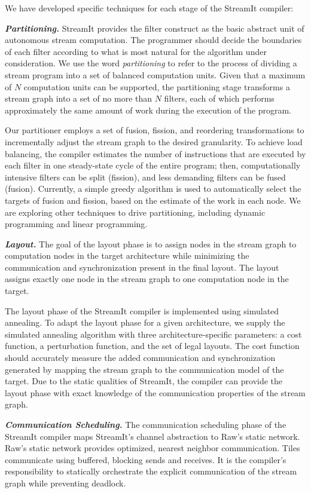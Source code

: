 We have developed specific techniques for each stage of the StreamIt
compiler:

{\bf {\em Partitioning.}} StreamIt provides the filter construct as the
basic abstract unit of autonomous stream computation.  The programmer
should decide the boundaries of each filter according to what is most
natural for the algorithm under consideration. We use the word {\it
partitioning} to refer to the process of dividing a stream program
into a set of balanced computation units.  Given that a maximum of $N$
computation units can be supported, the partitioning stage transforms
a stream graph into a set of no more than $N$ filters, each of which
performs approximately the same amount of work during the execution of
the program.

Our partitioner employs a set of fusion, fission, and reordering
transformations to incrementally adjust the stream graph to the
desired granularity.  To achieve load balancing, the compiler
estimates the number of instructions that are executed by each filter
in one steady-state cycle of the entire program; then, computationally
intensive filters can be split (fission), and less demanding filters
can be fused (fusion).  Currently, a simple greedy algorithm is used
to automatically select the targets of fusion and fission, based on
the estimate of the work in each node.  We are exploring other
techniques to drive partitioning, including dynamic programming and
linear programming.

{\bf {\em Layout.}} The goal of the layout phase is to assign nodes in the
stream graph to computation nodes in the target architecture while
minimizing the communication and synchronization present in the final
layout.  The layout assigns exactly one node in the stream graph to
one computation node in the target.

The layout phase of the StreamIt compiler is implemented using
simulated annealing.  To adapt the layout phase for a given
architecture, we supply the simulated annealing algorithm with three
architecture-specific parameters: a cost function, a perturbation
function, and the set of legal layouts.  The cost function should
accurately measure the added communication and synchronization
generated by mapping the stream graph to the communication model of
the target.  Due to the static qualities of StreamIt, the compiler can
provide the layout phase with exact knowledge of the communication
properties of the stream graph.

{\bf {\em Communication Scheduling.}}  The communication scheduling
phase of the StreamIt compiler maps StreamIt's channel abstraction to
Raw's static network.  Raw's static network provides optimized,
nearest neighbor communication.  Tiles communicate using buffered,
blocking sends and receives.  It is the compiler's responsibility to
statically orchestrate the explicit communication of the stream graph
while preventing deadlock.

